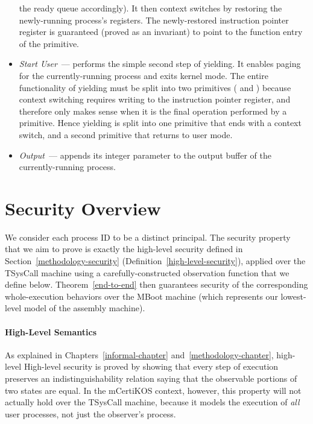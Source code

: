 \begin{itemize}
the ready queue accordingly). It then 
context switches by restoring the newly-running process's registers. The 
newly-restored instruction pointer register is guaranteed (proved as an invariant) to 
point to the function entry of the  primitive.
\item \emph{Start User}~---  performs the simple second step
of yielding. It enables paging for the currently-running process and exits
kernel mode. The entire functionality of yielding must be split into
two primitives ( and ) because
context switching requires writing to the instruction pointer register,
and therefore only makes sense when it is the final operation performed by
a primitive. 
Hence yielding is split into one primitive that ends with a 
context switch, and a second primitive that returns to user mode.
\item \emph{Output}~---  appends its integer parameter to the
output buffer of the currently-running process.
\end{itemize}

\section{Security Overview}
\label{ssec:security-overview}

We consider each process ID to be a
distinct principal. 
The security property that we aim to prove is exactly the high-level
security defined in Section~\ref{methodology-security} 
(Definition~\ref{high-level-security}), applied over the TSysCall machine 
using a carefully-constructed observation function that we define below. 
Theorem~\ref{end-to-end} then guarantees security of 
the corresponding whole-execution behaviors over the MBoot machine 
(which represents our lowest-level model of the assembly machine).

\paragraph{High-Level Semantics}
\ifextended
As explained in Chapters~\ref{informal-chapter} and~\ref{methodology-chapter},
high-level
\else
High-level \fi 
security is proved by showing that every step of
execution preserves an indistinguishability relation saying 
that the observable portions of two states are equal. In
the mCertiKOS context, however, this property will not actually
hold over the TSysCall machine, because it models the
execution of \emph{all} user processes, not just the observer's process.

